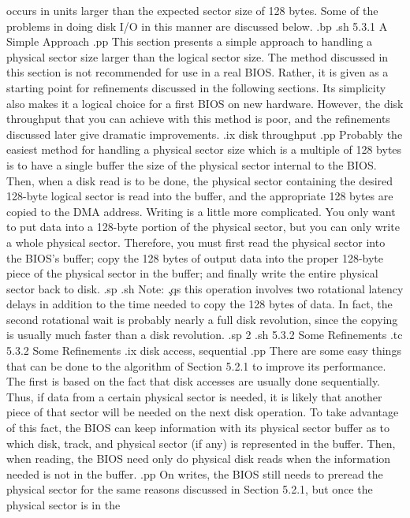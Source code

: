 occurs in units larger than the expected sector size of 128 bytes.
Some of the problems in doing disk I/O in this manner are discussed below.
.bp
.sh
5.3.1  A Simple Approach
.pp
This section presents a simple approach to handling a physical sector size
larger than the logical sector size.  The method discussed in this section
is not recommended for use in a real BIOS.  Rather, it is given as a 
starting point for refinements discussed in the following sections.  
Its simplicity also makes it a logical choice for a first BIOS on new
hardware.  However, the disk throughput that you can achieve with this method 
is poor, and the refinements discussed later give dramatic improvements.
.ix disk throughput
.pp
Probably the easiest method for handling a physical sector size which
is a multiple of 128 bytes is to have a single buffer the size of the
physical sector internal to the BIOS.  Then, when a disk read is to be
done, the physical sector containing the desired 128-byte logical sector 
is read into the buffer, and the appropriate 128 bytes are copied to the
DMA address.  Writing is a little more complicated.  You only want to
put data into a 128-byte portion of the physical sector, but you can
only write a whole physical sector.  Therefore, you must first read the
physical sector into the BIOS's buffer; copy the 128 bytes of output data
into the proper 128-byte piece of the physical sector in the buffer; and
finally write the entire physical sector back to disk.  
.sp
.sh
Note:  \c
.qs
this operation involves two rotational latency delays in addition to the time 
needed to copy the 128 bytes of data.  In fact, the second rotational wait
is probably nearly a full disk revolution, since the copying is usually
much faster than a disk revolution.  
.sp 2
.sh
5.3.2  Some Refinements
.tc         5.3.2  Some Refinements
.ix disk access, sequential
.pp
There are some easy things that can be done to the algorithm of Section 5.2.1 
to improve its performance.  The first is based on the fact that disk
accesses are usually done sequentially.  Thus, if data from a certain physical
sector is needed, it is likely that another piece of that sector will be
needed on the next disk operation.  To take advantage of this fact, the BIOS
can keep information with its physical sector buffer as to which disk, 
track, and physical sector (if any) is represented in the buffer.  Then, when
reading, the BIOS need only do physical disk reads when the information needed
is not in the buffer.  
.pp
On writes, the BIOS still needs to preread the physical sector for the same 
reasons discussed in Section 5.2.1, but once the physical sector is in the 
